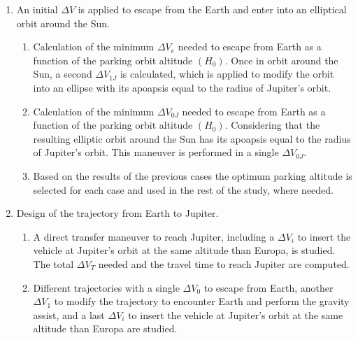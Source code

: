 \begin{enumerate}
\item An initial $\Delta V$ is applied to escape from the Earth and enter into an elliptical orbit around the Sun.

	\begin{enumerate}
	\item \label{it:escape_two_steps_jupiter} Calculation of the minimum $\Delta V_{e}$ needed to escape from Earth as a function of the parking orbit altitude $(H_0)$. Once in orbit around the Sun, a second $\Delta V_{1J}$ is calculated, which is applied to modify the orbit into an ellipse with its apoapsis equal to the radius of Jupiter's orbit.
	
	\item \label{it:escape_one_step_jupiter} Calculation of the minimum $\Delta V_{0J}$ needed to escape from Earth as a function of the parking orbit altitude $(H_0)$. Considering that the resulting elliptic orbit around the Sun has its apoapsis equal to the radius of Jupiter's orbit. This maneuver is performed in a single $\Delta V_{0J}$.
	
	\item Based on the results of the previous cases the optimum parking altitude is selected for each case and used in the rest of the study, where needed.
	\end{enumerate}

\item Design of the trajectory from Earth to Jupiter.

	\begin{enumerate}
	\item \label{it:direct} A direct transfer maneuver to reach Jupiter, including a $\Delta V_{i}$ to insert the vehicle at Jupiter's orbit at the same altitude than Europa, is studied. The total $\Delta V_T$ needed and the travel time to reach Jupiter are computed.

	\item \label{it:gravity_assist} Different trajectories with a single $\Delta V_{0}$ to escape from Earth, another $\Delta V_{1}$ to modify the trajectory to encounter Earth and perform the gravity assist, and a last $\Delta V_{i}$ to insert the vehicle at Jupiter's orbit at the same altitude than Europa are studied.
    

\end{enumerate}
\end{enumerate}
